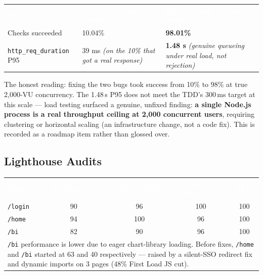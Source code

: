 \documentclass[11pt,a4paper]{article}
\newcommand{\code}[1]{\texttt{\small #1}}
\begin{document}
\begin{table}[H]
\centering\small
\renewcommand{\arraystretch}{1.25}
\begin{tabularx}{\textwidth}{l X X}
\toprule
\rowcolor{amdoxnavy}
\textcolor{white}{\textbf{Metric}} & \textcolor{white}{\textbf{Run 1 (baseline, broken)}} & \textcolor{white}{\textbf{Run 4 (fixed, 150-user pool)}} \\
Checks succeeded & 10.04\% & \textbf{98.01\%} \\
\rowcolor{amdoxlight}
\code{http\_req\_duration} P95 & 39 ms \emph{(on the 10\% that got a real response)} & \textbf{1.48 s} \emph{(genuine queueing under real load, not rejection)} \\
\bottomrule
\end{tabularx}
\end{table}

\noindent
The honest reading: fixing the two bugs took success from 10\% to 98\% at true
2{,}000-VU concurrency. The 1.48\,s P95 does not meet the TDD's 300\,ms target at this
scale --- load testing surfaced a genuine, unfixed finding: \textbf{a single Node.js
process is a real throughput ceiling at 2{,}000 concurrent users}, requiring clustering
or horizontal scaling (an infrastructure change, not a code fix). This is recorded as a
roadmap item rather than glossed over.

\subsection{Lighthouse Audits}

\begin{table}[H]
\centering\small
\renewcommand{\arraystretch}{1.25}
\begin{tabularx}{\textwidth}{l c c c c}
\toprule
\rowcolor{amdoxnavy}
\textcolor{white}{\textbf{Page}} &
\textcolor{white}{\textbf{Performance}} &
\textcolor{white}{\textbf{Accessibility}} &
\textcolor{white}{\textbf{Best Practices}} &
\textcolor{white}{\textbf{SEO}} \\
\code{/login} & 90 & 96 & 100 & 100 \\
\rowcolor{amdoxlight}
\code{/home}  & 94 & 100 & 96 & 100 \\
\code{/bi}    & 82 & 90 & 96 & 100 \\
\bottomrule
\multicolumn{5}{p{\textwidth}}{\small \code{/bi} performance is lower due to eager chart-library loading. Before fixes, \code{/home} and \code{/bi} started at 63 and 40 respectively --- raised by a silent-SSO redirect fix and dynamic imports on 3 pages (48\% First Load JS cut).}
\end{tabularx}
\end{table}
\end{document}
